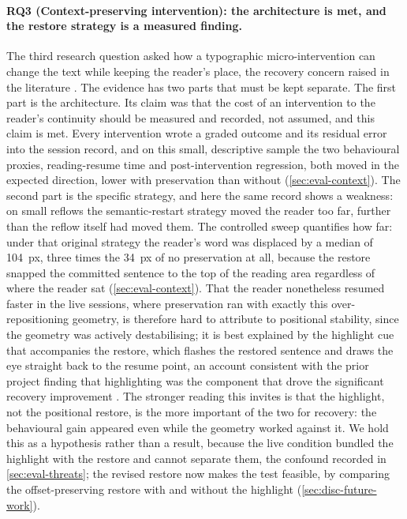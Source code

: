 \paragraph{RQ3 (Context-preserving intervention): the architecture is met, and the restore strategy is a measured finding.}
The third research question asked how a typographic micro-intervention can change the text while keeping the reader's place, the recovery concern raised in the literature \cite{jensen2025context}.
The evidence has two parts that must be kept separate.
The first part is the architecture.
Its claim was that the cost of an intervention to the reader's continuity should be measured and recorded, not assumed, and this claim is met.
Every intervention wrote a graded outcome and its residual error into the session record, and on this small, descriptive sample the two behavioural proxies, reading-resume time and post-intervention regression, both moved in the expected direction, lower with preservation than without (\cref{sec:eval-context}).
The second part is the specific strategy, and here the same record shows a weakness: on small reflows the semantic-restart strategy moved the reader too far, further than the reflow itself had moved them.
The controlled sweep quantifies how far: under that original strategy the reader's word was displaced by a median of \SI{104}{px}, three times the \SI{34}{px} of no preservation at all, because the restore snapped the committed sentence to the top of the reading area regardless of where the reader sat (\cref{sec:eval-context}).
That the reader nonetheless resumed faster in the live sessions, where preservation ran with exactly this over-repositioning geometry, is therefore hard to attribute to positional stability, since the geometry was actively destabilising; it is best explained by the highlight cue that accompanies the restore, which flashes the restored sentence and draws the eye straight back to the resume point, an account consistent with the prior project finding that highlighting was the component that drove the significant recovery improvement \cite{jensen2025context}.
The stronger reading this invites is that the highlight, not the positional restore, is the more important of the two for recovery: the behavioural gain appeared even while the geometry worked against it.
We hold this as a hypothesis rather than a result, because the live condition bundled the highlight with the restore and cannot separate them, the confound recorded in \cref{sec:eval-threats}; the revised restore now makes the test feasible, by comparing the offset-preserving restore with and without the highlight (\cref{sec:disc-future-work}).
